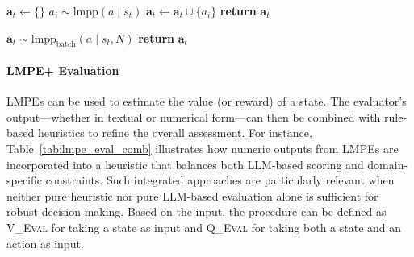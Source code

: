 \begin{procedure}[h!]
\caption{LMPP Sampling: Sample Actions One at a Time}
\label{alg:lmpp_sampling_one}
\small
\noindent
\begin{algorithmic}[1]
        \State $\mathbf{a}_t \gets \{\}$ 
            \State $a_i \sim \text{lmpp}\left(a \mid s_t\right)$
            \State $\mathbf{a}_t \gets \mathbf{a}_t \cup \{a_i\}$
        \EndFor
        \State \textbf{return} $\mathbf{a}_t$
    \EndProcedure
\end{algorithmic}
\end{procedure}

\begin{procedure}[h!]
\caption{LMPP Sampling: Sample All Actions at Once}
\label{alg:lmpp_sampling_batch}
\small
\noindent
\begin{algorithmic}[1]
        \State $\mathbf{a}_t \sim \text{lmpp}_\text{batch} \left(a \mid s_t, N \right)$
        \State \textbf{return} $\mathbf{a}_t$
    \EndProcedure
\end{algorithmic}
\end{procedure}

\paragraph{LMPE+ Evaluation}
LMPEs can be used to estimate the value (or reward) of a state. The evaluator’s output—whether in textual or numerical form—can then be combined with rule-based heuristics to refine the overall assessment. For instance, Table~\ref{tab:lmpe_eval_comb} illustrates how numeric outputs from LMPEs are incorporated into a heuristic that balances both LLM-based scoring and domain-specific constraints. Such integrated approaches are particularly relevant when neither pure heuristic nor pure LLM-based evaluation alone is sufficient for robust decision-making. 
Based on the input, the procedure can be defined as \textsc{V\_Eval} for taking a state as input and \textsc{Q\_Eval} for taking both a state and an action as input.

